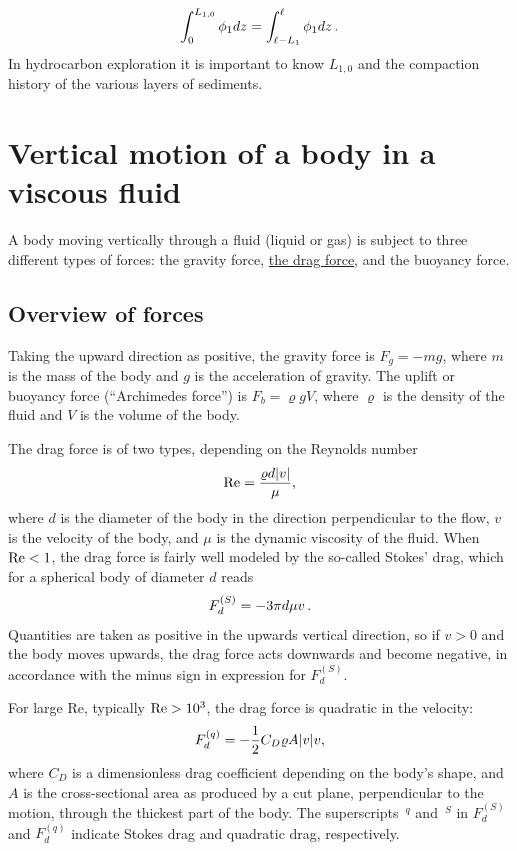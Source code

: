\documentclass[%
oneside,                 %
final,                   %
10pt]{article}
\begin{document}
\[ \int_0^{L_{1,0}} \phi_1 dz = \int_{\ell-L_1}^{\ell}\phi_1 dz \tp \]
In hydrocarbon exploration it is important to know $L_{1,0}$ and the
compaction history of the various layers of sediments.

\section{Vertical motion of a body in a viscous fluid}
\label{decay:app:drag}


A body moving vertically through a fluid (liquid or gas) is subject to
three different types of forces: the gravity force, \href{{http://en.wikipedia.org/wiki/Drag_(physics)}}{the drag force},
and the buoyancy force.

\subsection{Overview of forces}

Taking the upward direction as positive,
the gravity force is $F_g= -mg$, where $m$ is the mass of the body and
$g$ is the acceleration of gravity.
The uplift or buoyancy force (``Archimedes force'') is $F_b = \varrho gV$,
where $\varrho$ is the density of the fluid and
$V$ is the volume of the body.

The drag force is of two types, depending on the Reynolds number
\begin{equation}
\hbox{Re} = \frac{\varrho d|v|}{\mu},
\end{equation}
where $d$ is the diameter of the body in
the direction perpendicular to the flow, $v$ is the velocity of the
body, and $\mu$ is the dynamic viscosity of the fluid.
When $\hbox{Re} < 1$, the drag force is fairly well modeled by
the so-called Stokes' drag,
which for a spherical body of diameter $d$ reads
\begin{equation}
F_d^{(S)} = - 3\pi d\mu v
\tp
\end{equation}
Quantities are taken as positive in the upwards vertical direction, so
if $v>0$ and the body moves upwards, the drag force acts downwards and
become negative, in accordance with the minus sign in expression for
$F_d^{(S)}$.

For large Re, typically $\hbox{Re} > 10^3$, the drag force is quadratic
in the velocity:
\begin{equation}
F_d^{(q)} = -{1\over2}C_D\varrho A|v|v,
\end{equation}
where $C_D$ is a dimensionless drag coefficient depending on the body's shape,
and $A$ is the cross-sectional area as
produced by a cut plane, perpendicular to the motion, through the thickest
part of the body. The superscripts $\,{}^q$ and $\,{}^S$ in
$F_d^{(S)}$ and $F_d^{(q)}$ indicate Stokes drag and quadratic drag,
respectively.
\end{document}
